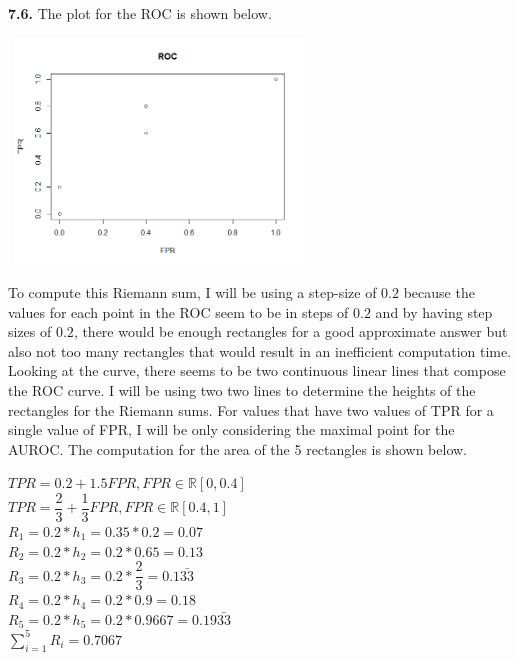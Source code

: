 \documentclass[12pt]{article}
\begin{document}
{\bf 7.6.} The plot for the ROC is shown below.

\begin{center}

\includegraphics[width=8cm, height=6cm]{ROC_Plot}

\end{center}

To compute this Riemann sum, I will be using a step-size of $0.2$ because the values for each point in the ROC seem to be in steps of $0.2$ and by having step sizes of $0.2$, there would be enough rectangles for a good approximate answer but also not too many rectangles that would result in an inefficient computation time. Looking at the curve, there seems to be two continuous linear lines that compose the ROC curve. I will be using two two lines to determine the heights of the rectangles for the Riemann sums. For values that have two values of TPR for a single value of FPR, I will be only considering the maximal point for the AUROC. The computation for the area of the 5 rectangles is shown below.

\begin{center}

$TPR=0.2+1.5FPR, FPR\in \mathbb{R}[0,0.4]$\\
\bigskip
$TPR=\dfrac{2}{3}+\dfrac{1}{3}FPR, FPR\in \mathbb{R}[0.4,1]$\\
\bigskip
$R_{1}=0.2*h_{1}=0.35*0.2=0.07$\\
\bigskip
$R_{2}=0.2*h_{2}=0.2*0.65=0.13$\\
\bigskip
$R_{3}=0.2*h_{3}=0.2*\dfrac{2}{3}=0.1\bar{33}$\\
\bigskip
$R_{4}=0.2*h_{4}=0.2*0.9=0.18$\\
\bigskip
$R_{5}=0.2*h_{5}=0.2*0.9667=0.19\bar{33}$\\
\bigskip
$\displaystyle \sum_{i=1}^{5}R_{i}=0.7067$\\

\end{center}
\end{document}
